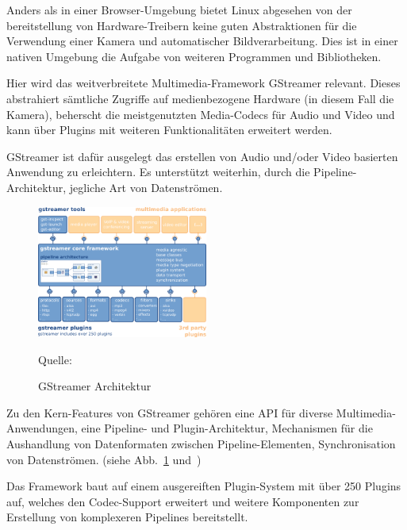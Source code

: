 \documentclass{article}
\newcommand{\figuresource}[1]{
	\begin{center}Quelle: #1\end{center}
}
\begin{document}
\begin{onecolumn}
Anders als in einer Browser-Umgebung bietet Linux abgesehen von der
bereitstellung von Hardware-Treibern keine guten Abstraktionen für die
Verwendung einer Kamera und automatischer Bildverarbeitung. Dies ist in einer
nativen Umgebung die Aufgabe von weiteren Programmen und Bibliotheken.

Hier wird das weitverbreitete Multimedia-Framework GStreamer relevant. Dieses
abstrahiert sämtliche Zugriffe auf medienbezogene Hardware (in diesem Fall die
Kamera), beherscht die meistgenutzten Media-Codecs für Audio und Video und kann
über Plugins mit weiteren Funktionalitäten erweitert werden.

GStreamer ist dafür ausgelegt das erstellen von Audio und/oder Video basierten
Anwendung zu erleichtern. Es unterstützt weiterhin, durch die
Pipeline-Architektur, jegliche Art von Datenströmen.


\begin{figure}[ht]
	\includegraphics[width=0.5\textwidth]{gstreamer-overview.png}
	\centering
	\caption[GStreamer Architektur~\cite{GStreamerManualIntro}]{GStreamer Architektur}\label{fig:gstreamer-arch}
	\figuresource{\cite{GStreamerManualIntro}}
\end{figure}

Zu den Kern-Features von GStreamer gehören eine API für diverse
Multimedia-Anwendungen, eine Pipeline- und Plugin-Architektur, Mechanismen für
die Aushandlung von Datenformaten zwischen Pipeline-Elementen, Synchronisation
von Datenströmen. (siehe Abb.~\ref{fig:gstreamer-arch}
und~\cite{GStreamerManualIntro})

Das Framework baut auf einem ausgereiften Plugin-System mit über 250 Plugins
auf, welches den Codec-Support erweitert und weitere Komponenten zur Erstellung
von komplexeren Pipelines bereitstellt.


\end{onecolumn}
\end{document}
